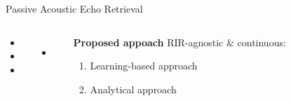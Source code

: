 \begin{frame}[t]{\alert{Passive} Acoustic Echo Retrieval \hfill\faBook}
        \pause
        \vspace{1em}
        \begin{columns}[T,onlytextwidth] %
            \small
                \begin{itemize}
                    \item[\xmark] 
                    \item[\xmark] 
                    \item[\xmark] 
                \end{itemize}

            \pause
                \begin{itemize}
                    \item[\xmark] 
                    \\
                \end{itemize}

                \begin{mycontriblock}{\textcolor{myred}{\textbf{Proposed appoach}}}
                    \small
                    RIR-agnostic \& continuous:
                    \begin{enumerate}
                        \item Learning-based approach
                        \item Analytical approach
                    \end{enumerate}
                \end{mycontriblock}
        \end{columns}

\end{frame}


\subsection{\blaster}

